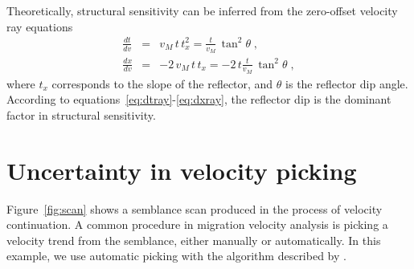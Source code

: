 Theoretically, structural sensitivity can be inferred from the zero-offset velocity ray equations \cite[]{GEO46-05-07170733,GEO68-05-16501661}
\begin{eqnarray}
\label{eq:dtray}        
\displaystyle \frac{d t}{d v} & = & v_M\,t\,t_x^2 = \frac{t}{v_M}\,\tan^2{\theta}\;, \\
 \label{eq:dxray}        
\displaystyle \frac{d x}{d v} & = & -2\,v_M\,t\,t_x = -2\,t\frac{t}{v_M}\,\tan^2{\theta}\;, 
\end{eqnarray}
where $t_x$ corresponds to the slope of the reflector, and $\theta$ is
the reflector dip angle. According to
equations~\ref{eq:dtray}-\ref{eq:dxray}, the reflector dip is the
dominant factor in structural sensitivity.

\section{Uncertainty in velocity picking}


Figure~\ref{fig:scan} shows a semblance scan produced in the process
of velocity continuation. A common procedure in migration velocity
analysis is picking a velocity trend from the semblance, either
manually or automatically. In this example, we use automatic picking
with the algorithm described by \cite{avo}.


